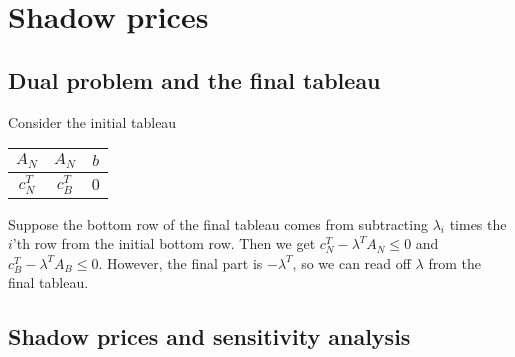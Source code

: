 \documentclass[12pt]{article}
\theoremstyle{definition}
\theoremstyle{remark}
\begin{document}
\newpage

\section{Shadow prices}%
\label{sec:shadow_prices}

\subsection{Dual problem and the final tableau}%
\label{sub:dual_problem_and_the_final_tableau}

Consider the initial tableau
\begin{center}
	\begin{tabular}{cc|c}
		$A_N$ & $A_N$ & $b$ \\
		\hline
		$c^{T}_N$ & $c^T_B$ & $0$
	\end{tabular}
\end{center}
Suppose the bottom row of the final tableau comes from subtracting $\lambda_i$ times the $i$'th row from the initial bottom row. Then we get $c^T_N - \lambda^TA_N \leq 0$ and $c^T_B - \lambda^{T}A_B \leq 0$. However, the final part is $-\lambda^T$, so we can read off $\lambda$ from the final tableau.

\subsection{Shadow prices and sensitivity analysis}%
\label{sub:shadow_prices_and_sensitivity_analysis}
\end{document}
